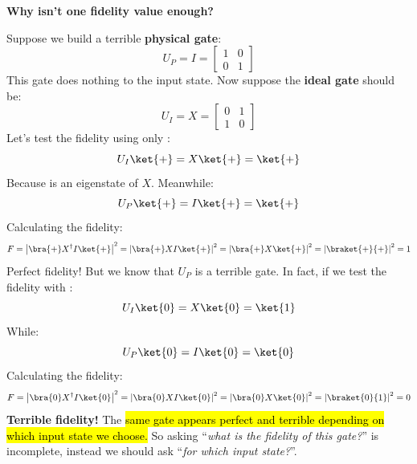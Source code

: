 \highspace
\begin{flushleft}
    \textcolor{Red2}{ \textbf{Why isn't one fidelity value enough?}}
\end{flushleft}
Suppose we build a terrible \textbf{physical gate}:
\begin{equation*}
    U_P = I = \begin{bmatrix}
        1 & 0 \\
        0 & 1
    \end{bmatrix}
\end{equation*}
This gate does nothing to the input state. Now suppose the \textbf{ideal gate} should be:
\begin{equation*}
    U_I = X = \begin{bmatrix}
        0 & 1 \\
        1 & 0
    \end{bmatrix}
\end{equation*}
Let's test the fidelity using only \ket{+}:
\begin{equation*}
    U_I\ket{+} = X\ket{+} = \ket{+}
\end{equation*}
Because \ket{+} is an eigenstate of $X$. Meanwhile:
\begin{equation*}
    U_P\ket{+} = I\ket{+} = \ket{+}
\end{equation*}
Calculating the fidelity:
\begin{equation*}
    F = \left| \bra{+} X^\dagger I \ket{+} \right|^2 = \left| \bra{+} X I \ket{+} \right|^2 = \left| \bra{+} X \ket{+} \right|^2 = \left| \braket{+}{+} \right|^2 = 1
\end{equation*}
Perfect fidelity! But we know that $U_P$ is a terrible gate. In fact, if we test the fidelity with :
\begin{equation*}
    U_I\ket{0} = X\ket{0} = \ket{1}
\end{equation*}
While:
\begin{equation*}
    U_P\ket{0} = I\ket{0} = \ket{0}
\end{equation*}
Calculating the fidelity:
\begin{equation*}
    F = \left| \bra{0} X^\dagger I \ket{0} \right|^2 = \left| \bra{0} X I \ket{0} \right|^2 = \left| \bra{0} X \ket{0} \right|^2 = \left| \braket{0}{1} \right|^2 = 0
\end{equation*}
\textbf{Terrible fidelity!} The \hl{same gate appears perfect and terrible depending on which input state we choose.} So asking ``\emph{what is the fidelity of this gate?}'' is incomplete, instead we should ask ``\emph{for which input state?}''.

